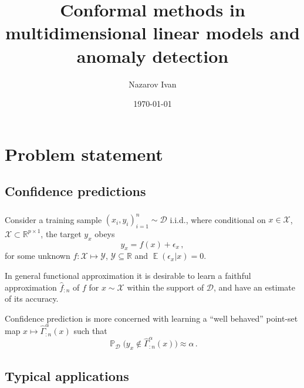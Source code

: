 \documentclass[t]{beamer}  %
\title{Conformal methods in multidimensional linear models and anomaly detection}
\author[Nazarov Ivan]{Nazarov Ivan}
\date{\today}
\institute[Higher School of Economics]{National Research University \\ Higher School of Economics}
\newcommand{\Ycal}{\mathcal{Y}}
\newcommand{\Dcal}{\mathcal{D}}
\newcommand{\Xcal}{\mathcal{X}}
\newcommand{\Real}{\mathbb{R}}
\newcommand{\ex}{\mathop{\mathbb{E}}\nolimits}
\newcommand{\pr}{\mathop{\mathbb{P}}\nolimits}
\begin{document}
\frame[plain]{\titlepage} %

\section{Problem statement} %
\label{sec:problem_statement}
\subsection{Confidence predictions} %
\label{sub:confidence_predictions}

\begin{frame}[c]\frametitle{\insertsection}
  \framesubtitle{\insertsubsection}
  Consider a training sample $(x_i, y_i)_{i=1}^n \sim \Dcal$ i.i.d., where conditional
  on $x\in \Xcal$, $\Xcal \subset \Real^{p\times 1}$, the target $y_x$ obeys
  $$ y_x = f(x) + \epsilon_x \,, $$
  for some unknown $f:\Xcal\mapsto \Ycal$, $\Ycal\subseteq \Real$ and $\ex(\epsilon_x|x) = 0$.

  In general functional approximation it is desirable to learn a faithful approximation
  $\hat{f}_{:n}$ of $f$ for $x\sim \Xcal$ within the support of $\Dcal$, and have an
  estimate of its accuracy.

  Confidence prediction is more concerned with learning a ``well behaved'' point-set
  map $x \mapsto \hat{\Gamma}_{:n}^\alpha(x)$ such that
  $$ \pr_\Dcal\bigl(y_x \notin \hat{\Gamma}_{:n}^\alpha(x)\bigr) \approx \alpha \,. $$
\end{frame}


\subsection{Typical applications} %
\label{sub:typical_applications}
\end{document}
